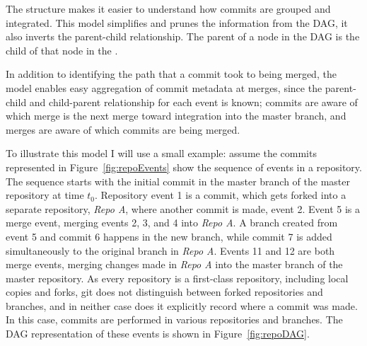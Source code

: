 The structure makes it easier to understand how commits are grouped and
integrated. This model simplifies and prunes the information from the
DAG, it also inverts the parent-child relationship. The parent of a node
in the DAG is the child of that node in the \mt{}.

In addition to identifying the path that a commit took to being merged,
the model enables easy aggregation of commit metadata at merges,
since the parent-child and child-parent relationship for each event
is known;
commits are aware of which merge is the next merge toward integration
into the master branch, and merges are aware of which commits are being
merged.

To illustrate this model I will use a small example: assume the commits
represented in Figure~\ref{fig:repoEvents} show the sequence of events
in a repository. The sequence starts with the initial commit in the
master branch of the master repository at time $t_0$. Repository event 1
is a commit, which gets forked into a separate repository, \textit{Repo
  A}, where another commit is made, event 2. Event 5 is a merge event,
merging events 2, 3, and 4 into \textit{Repo A}. A branch created from
event 5 and commit 6 happens in the new branch, while commit 7 is added
simultaneously to the original branch in \textit{Repo A}. Events 11 and
12 are both merge events, merging changes made in \textit{Repo A} into
the master branch of the master repository. As every repository is a
first-class repository, including local copies and forks, git does not
distinguish between forked repositories and branches, and in neither
case does it explicitly record where a commit was made. In this case,
commits are performed in various repositories and branches. The DAG
representation of these events is shown in Figure~\ref{fig:repoDAG}.


